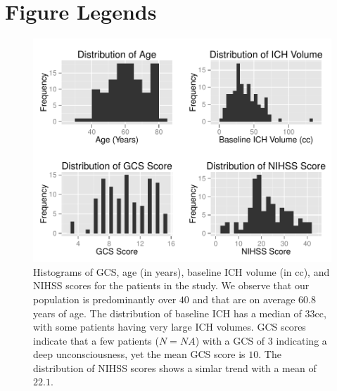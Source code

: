 \documentclass[10pt]{article}\usepackage[]{graphicx}\usepackage[]{color}
\begin{document}







\newpage
\section{Figure Legends}



\begin{figure}[H]
\begin{center}
\includegraphics[scale=1]{histdem.pdf}
\end{center}
\caption{Histograms of GCS, age (in years), baseline ICH volume (in cc), and NIHSS scores for the patients in the study. We observe that our population is predominantly over $40$ and that are on average 60.8 years of age.  The distribution of baseline ICH has a median of 33cc, with some patients having very large ICH volumes.  GCS scores indicate that a few patients ($N = NA$) with a GCS of $3$ indicating a deep unconsciousness, yet the mean GCS score is $10$.  The distribution of NIHSS scores shows a simlar trend with a mean of $22.1$.   }\label{fig:histdem}
\end{figure}
\end{document}
